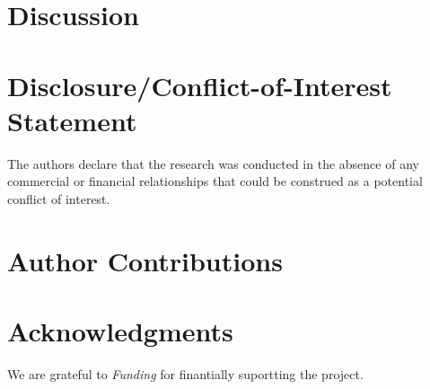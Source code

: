 \documentclass{frontiersSCNS} %
\begin{document}



\section{Discussion}


\section*{Disclosure/Conflict-of-Interest Statement}


The authors declare that the research was conducted in the absence of any commercial or financial relationships that could be construed as a potential conflict of interest.

\section*{Author Contributions}



\section*{Acknowledgments}
 We are grateful to  
\textit{Funding\textcolon} for finantially suportting the project.




\end{document}
